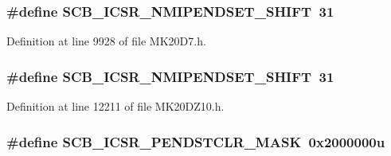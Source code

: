 \subsubsection[{\texorpdfstring{S\+C\+B\+\_\+\+I\+C\+S\+R\+\_\+\+N\+M\+I\+P\+E\+N\+D\+S\+E\+T\+\_\+\+S\+H\+I\+FT}{SCB_ICSR_NMIPENDSET_SHIFT}}]{\setlength{\rightskip}{0pt plus 5cm}\#define S\+C\+B\+\_\+\+I\+C\+S\+R\+\_\+\+N\+M\+I\+P\+E\+N\+D\+S\+E\+T\+\_\+\+S\+H\+I\+FT~31}\hypertarget{group___s_c_b___register___masks_ga8a185fc794df7e755e5f3a8b3a06d042}{}\label{group___s_c_b___register___masks_ga8a185fc794df7e755e5f3a8b3a06d042}


Definition at line 9928 of file M\+K20\+D7.\+h.

\subsubsection[{\texorpdfstring{S\+C\+B\+\_\+\+I\+C\+S\+R\+\_\+\+N\+M\+I\+P\+E\+N\+D\+S\+E\+T\+\_\+\+S\+H\+I\+FT}{SCB_ICSR_NMIPENDSET_SHIFT}}]{\setlength{\rightskip}{0pt plus 5cm}\#define S\+C\+B\+\_\+\+I\+C\+S\+R\+\_\+\+N\+M\+I\+P\+E\+N\+D\+S\+E\+T\+\_\+\+S\+H\+I\+FT~31}\hypertarget{group___s_c_b___register___masks_ga8a185fc794df7e755e5f3a8b3a06d042}{}\label{group___s_c_b___register___masks_ga8a185fc794df7e755e5f3a8b3a06d042}


Definition at line 12211 of file M\+K20\+D\+Z10.\+h.

\subsubsection[{\texorpdfstring{S\+C\+B\+\_\+\+I\+C\+S\+R\+\_\+\+P\+E\+N\+D\+S\+T\+C\+L\+R\+\_\+\+M\+A\+SK}{SCB_ICSR_PENDSTCLR_MASK}}]{\setlength{\rightskip}{0pt plus 5cm}\#define S\+C\+B\+\_\+\+I\+C\+S\+R\+\_\+\+P\+E\+N\+D\+S\+T\+C\+L\+R\+\_\+\+M\+A\+SK~0x2000000u}\hypertarget{group___s_c_b___register___masks_ga7dc9d2d6061166d9cfa66904477acd2e}{}\label{group___s_c_b___register___masks_ga7dc9d2d6061166d9cfa66904477acd2e}


